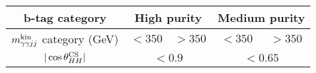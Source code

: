 \begin{tabular}{ |c ||  c | c | c | c |}
\hline
b-tag category & \multicolumn{2}{c|}{High purity} & \multicolumn{2}{c|}{Medium purity} \\\hline
$m_{\gamma\gamma jj}^{\rm kin}$ category (GeV) & $< 350$ & $> 350$ & $< 350$ & $> 350$  \\ \hline
$|\cos {\theta^{\rm CS}_{HH}}|$ &  \multicolumn{2}{c|}{$< 0.9$} & \multicolumn{2}{c|}{$< 0.65$} \\\hline
\end{tabular}
